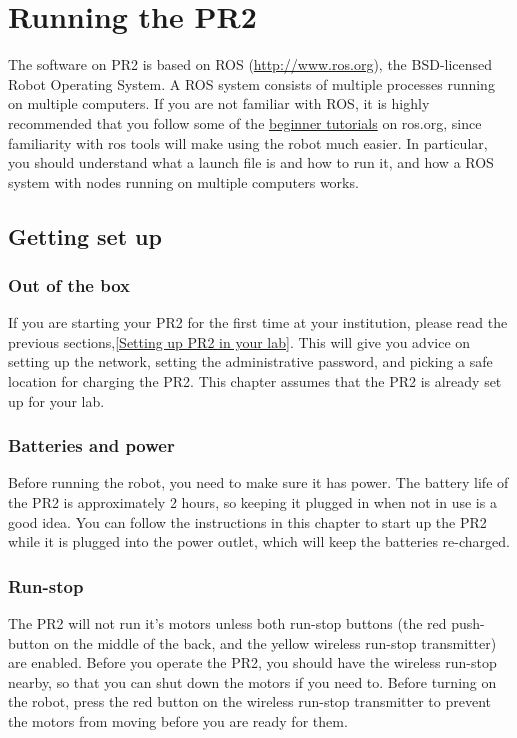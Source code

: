 \chapter{Running the PR2}
The software on PR2 is based on ROS (\href{http://www.ros.org}{http://www.ros.org}), the BSD-licensed Robot Operating System.  A ROS system consists of multiple processes running on multiple computers.  If you are not familiar with ROS, it is highly recommended that you follow some of the \href{http://www.ros.org/wiki/ROS/Tutorials}{beginner tutorials} on ros.org, since familiarity with ros tools will make using the robot much easier.  In particular, you should understand what a launch file is and how to run it, and how a ROS system with nodes running on multiple computers works.


\section{Getting set up}
\subsection{Out of the box}
If you are starting your PR2 for the first time at your institution, please read the previous sections,\ref{Setting up PR2 in your lab}.  This will give you advice on setting up the network, setting the administrative password, and picking a safe location for charging the PR2.  This chapter assumes that the PR2 is already set up for your lab.
\subsection{Batteries and power}
Before running the robot, you need to make sure it has power.  The battery life of the PR2 is approximately 2 hours, so keeping it plugged in when not in use is a good idea.  You can follow the instructions in this chapter to start up the PR2 while it is plugged into the power outlet, which will keep the batteries re-charged.
\subsection{Run-stop}
The PR2 will not run it's motors unless both run-stop buttons (the red push-button on the middle of the back, and the yellow wireless run-stop transmitter) are enabled.  Before you operate the PR2, you should have the wireless run-stop nearby, so that you can shut down the motors if you need to.  Before turning on the robot, press the red button on the wireless run-stop transmitter to prevent the motors from moving before you are ready for them.
